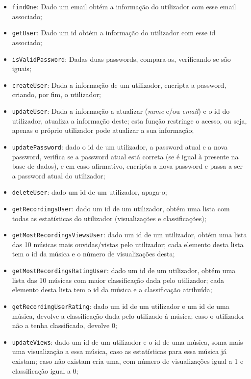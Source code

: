 \documentclass{article}
\begin{document}
    \begin{itemize}
        \item \texttt{findOne}: Dado um email obtém a informação do utilizador com esse email associado;
        \item \texttt{getUser}: Dado um id obtém a informação do utilizador com esse id associado;
        \item \texttt{isValidPassword}: Dadas duas passwords, compara-as, verificando se são iguais;
        \item \texttt{createUser}: Dada a informação de um utilizador, encripta a password, criando, por fim, o utilizador;
        \item \texttt{updateUser}: Dada a informação a atualizar (\textit{name} e/ou \textit{email}) e o id do utilizador, atualiza a informação deste; esta função restringe o acesso, ou seja, apenas o próprio utilizador pode atualizar a sua informação;
        \item \texttt{updatePassword}: dado o id de um utilizador, a password atual e a nova password, verifica se a password atual está correta (se é igual à presente na base de dados), e em caso afirmativo, encripta a nova password e passa a ser a password atual do utilizador;
        \item \texttt{deleteUser}: dado um id de um utilizador, apaga-o;
        \item \texttt{getRecordingsUser}: dado um id de um utilizador, obtém uma lista com todas as estatísticas do utilizador (visualizações e classificações);
        \item \texttt{getMostRecordingsViewsUser}: dado um id de um utilizador, obtém uma lista das 10 músicas mais ouvidas/vistas pelo utilizador; cada elemento desta lista tem o id da música e o número de visualizações desta;
        \item \texttt{getMostRecordingsRatingUser}: dado um id de um utilizador, obtém uma lista das 10 músicas com maior classificação dada pelo utilizador; cada elemento desta lista tem o id da música e a classificação atribuída;
        \item \texttt{getRecordingUserRating}: dado um id de um utilizador e um id de uma música, devolve a classificação dada pelo utilizado à música; caso o utilizador não a tenha classificado, devolve 0;
        \item \texttt{updateViews}: dado um id de um utilizador e o id de uma música, soma mais uma visualização a essa música, caso as estatísticas para essa música já existam; caso não existam cria uma, com número de visualizações igual a 1 e classificação igual a 0;

\end{itemize}
\end{document}
